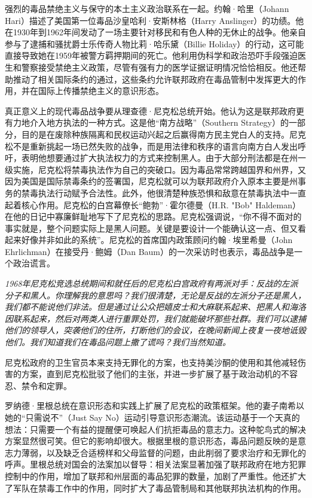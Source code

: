 \documentclass[fontset=fandol, a4paper, 12pt, openright]{ctexbook}
\renewenvironment{quote}
  {\list{}{\rightmargin\leftmargin}%
   \item\relax\small\itshape\color{black}}
  {\endlist}
\begin{document}
强烈的毒品禁绝主义与保守的本土主义政治联系在一起。约翰·哈里（Johann Hari）描述了美国第一位毒品沙皇哈利·安斯林格（Harry Anslinger）的功绩。他在1930年到1962年间发动了一场主要针对移民和有色人种的无休止的战争。他亲自参与了逮捕和骚扰爵士乐传奇人物比莉·哈乐黛（Billie Holiday）的行动，这可能直接导致她在1959年被警方羁押期间的死亡。他利用伪科学和政治恐吓手段强迫医生和警察接受禁绝主义政策，尽管有强有力的医学证据证明情况恰恰相反。他还帮助推动了相关国际条约的通过，这些条约允许联邦政府在毒品管制中发挥更大的作用，并在国际上传播禁绝主义的意识形态。

真正意义上的现代毒品战争要从理查德·尼克松总统开始。他认为这是联邦政府更有力地介入地方执法的一种方式。这是他“南方战略”（Southern Strategy）的一部分，目的是在废除种族隔离和民权运动兴起之后赢得南方民主党白人的支持。尼克松不是重新挑起一场已然失败的战争，而是用法律和秩序的语言向南方白人发出呼吁，表明他想要通过扩大执法权力的方式来控制黑人。由于大部分刑法都是在州一级实施，尼克松将禁毒执法作为自己的突破口。因为毒品常常跨越国界和州界，又因为美国是国际禁毒条约的签署国，尼克松就可以为联邦政府介入原本主要是州事务的禁毒执法行动赋予合法性。此外，他很清楚种族恐惧和敌意在禁毒执法中一直起着核心作用。尼克松的白宫幕僚长“鲍勃”·霍尔德曼（H.R. "Bob" Haldeman）在他的日记中寡廉鲜耻地写下了尼克松的思路。尼克松强调说，“你不得不面对的事实就是，整个问题实际上是黑人问题。关键是要设计一个能确认这一点、但又看起来好像并非如此的系统”。尼克松的首席国内政策顾问约翰·埃里希曼（John Ehrlichman）在接受丹·鲍姆（Dan Baum）的一次采访时也表示，毒品战争是一个政治谎言。

\begin{quote}
1968年尼克松竞选总统期间和就任后的尼克松白宫政府有两派对手：反战的左派分子和黑人。你理解我的意思吗？我们很清楚，无论是反战的左派分子还是黑人，我们都不能说他们非法。但是通过让公众把嬉皮士和大麻联系起来、把黑人和海洛因联系起来，然后对两类人进行重罪处罚，我们就能破坏那些社群。我们可以逮捕他们的领导人，突袭他们的住所，打断他们的会议，在晚间新闻上夜复一夜地诋毁他们。我们知道我们在毒品问题上撒了谎吗？我们当然知道。
\end{quote}

尼克松政府的卫生官员本来支持无罪化的方案，也支持美沙酮的使用和其他减轻伤害的方案，直到尼克松批驳了他们的主张，并进一步扩展了基于政治动机的不容忍、禁令和定罪。

罗纳德·里根总统在意识形态和实践上扩展了尼克松的政策框架。他的妻子南希以她的“只需说不”（Just Say No）运动引导意识形态潮流。该运动基于一个天真的想法：只需要一个有益的提醒便可唤起人们抗拒毒品的意志力。这种鸵鸟式的解决方案显然很可笑。但它的影响却很大。根据里根的意识形态，毒品问题反映的是意志力薄弱，以及缺乏合适榜样和父母监督的问题，由此削弱了要求治疗和无罪化的呼声。里根总统对国会的法案加以督导：相关法案显著加强了联邦政府在地方犯罪控制中的作用，增加了联邦和州层面的毒品犯罪的数量，加剧了严重性。他还扩大了军队在禁毒工作中的作用，同时扩大了毒品管制局和其他联邦执法机构的作用。
\end{document}
